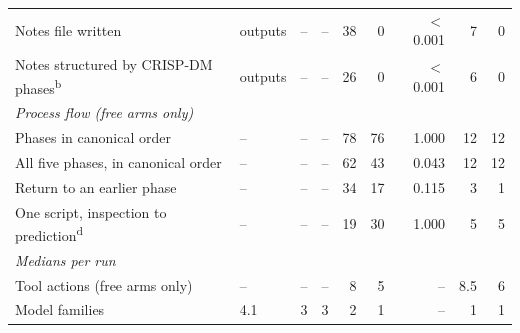 \begin{table}[htbp]
\begin{tabular}{llrrrrrrr}
    \quad Notes file written & outputs & -- & -- & 38 & 0 & $<$0.001 & 7 & 0 \\
    \quad Notes structured by CRISP-DM phases\textsuperscript{b} & outputs & -- & -- & 26 & 0 & $<$0.001 & 6 & 0 \\
    \midrule
    \multicolumn{9}{l}{\emph{Process flow (free arms only)}} \\
    \quad Phases in canonical order & -- & -- & -- & 78 & 76 & 1.000 & 12 & 12 \\
    \quad All five phases, in canonical order & -- & -- & -- & 62 & 43 & 0.043 & 12 & 12 \\
    \quad Return to an earlier phase & -- & -- & -- & 34 & 17 & 0.115 & 3 & 1 \\
    \quad One script, inspection to prediction\textsuperscript{d} & -- & -- & -- & 19 & 30 & 1.000 & 5 & 5 \\
    \midrule
    \multicolumn{9}{l}{\emph{Medians per run}} \\
    \quad Tool actions (free arms only) & -- & -- & -- & 8 & 5 & -- & 8.5 & 6 \\
    \quad Model families & 4.1 & 3 & 3 & 2 & 1 & -- & 1 & 1 \\
    \bottomrule
  \end{tabular}
\end{table}
